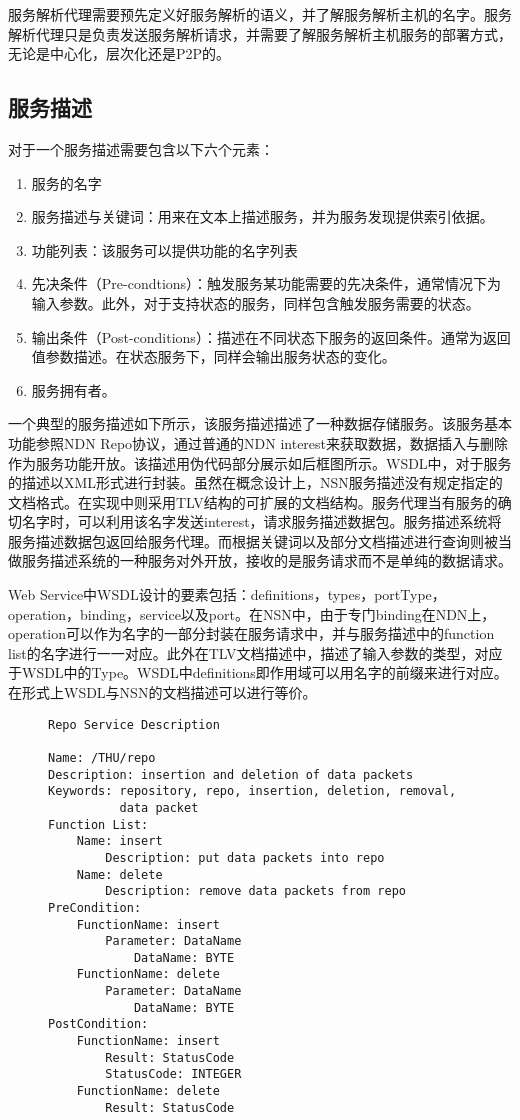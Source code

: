 服务解析代理需要预先定义好服务解析的语义，并了解服务解析主机的名字。服务解析代理只是负责发送服务解析请求，并需要了解服务解析主机服务的部署方式，无论是中心化，层次化还是P2P的。

\subsection{服务描述}
\label{description}
对于一个服务描述需要包含以下六个元素：
\begin{enumerate}[a]
\item 服务的名字
\item 服务描述与关键词：用来在文本上描述服务，并为服务发现提供索引依据。
\item 功能列表：该服务可以提供功能的名字列表
\item 先决条件（Pre-condtions）：触发服务某功能需要的先决条件，通常情况下为输入参数。此外，对于支持状态的服务，同样包含触发服务需要的状态。
\item 输出条件（Post-conditions）：描述在不同状态下服务的返回条件。通常为返回值参数描述。在状态服务下，同样会输出服务状态的变化。
\item 服务拥有者。
\end{enumerate}

一个典型的服务描述如下所示，该服务描述描述了一种数据存储服务。该服务基本功能参照NDN Repo协议，通过普通的NDN interest来获取数据，数据插入与删除作为服务功能开放。该描述用伪代码部分展示如后框图所示。WSDL中，对于服务的描述以XML形式进行封装。虽然在概念设计上，NSN服务描述没有规定指定的文档格式。在实现中则采用TLV结构的可扩展的文档结构。服务代理当有服务的确切名字时，可以利用该名字发送interest，请求服务描述数据包。服务描述系统将服务描述数据包返回给服务代理。而根据关键词以及部分文档描述进行查询则被当做服务描述系统的一种服务对外开放，接收的是服务请求而不是单纯的数据请求。

Web Service中WSDL设计的要素包括：definitions，types，portType，operation，binding，service以及port。在NSN中，由于专门binding在NDN上，operation可以作为名字的一部分封装在服务请求中，并与服务描述中的function list的名字进行一一对应。此外在TLV文档描述中，描述了输入参数的类型，对应于WSDL中的Type。WSDL中definitions即作用域可以用名字的前缀来进行对应。在形式上WSDL与NSN的文档描述可以进行等价。

\begin{figure}[h]
\begin{framed}
\begin{verbatim}
Repo Service Description

Name: /THU/repo
Description: insertion and deletion of data packets
Keywords: repository, repo, insertion, deletion, removal,
          data packet
Function List:
    Name: insert
        Description: put data packets into repo
    Name: delete
        Description: remove data packets from repo
PreCondition:
    FunctionName: insert
        Parameter: DataName
            DataName: BYTE
    FunctionName: delete
        Parameter: DataName
            DataName: BYTE
PostCondition:
    FunctionName: insert
        Result: StatusCode
        StatusCode: INTEGER
    FunctionName: delete
        Result: StatusCode
\end{verbatim}
\end{framed}
\end{figure}

